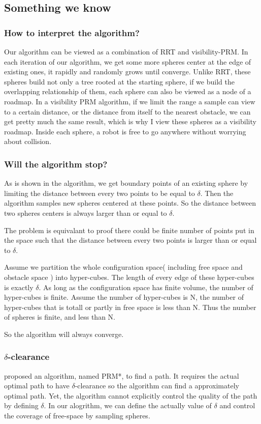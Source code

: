 \documentclass{article}
\begin{document}
	\subsection{Something we know}
    \subsubsection{How to interpret the algorithm? }
      Our algorithm can be viewed as a combination of RRT and visibility-PRM. In each iteration of our algorithm, we get some more spheres center at the edge of existing ones, it rapidly and randomly grows until converge. Unlike RRT, these spheres build not only a tree rooted at the starting sphere, if we build the overlapping relationship of them, each sphere can also be viewed as a node of a roadmap. In a visibility PRM algorithm, if we limit the range a sample can view to a certain distance, or the distance from itself to the nearest obstacle, we can get pretty much the same result, which is why I view these spheres as a visibility roadmap. Inside each sphere, a robot is free to go anywhere without worrying about collision. 

		\subsubsection{Will the algorithm stop?}
 			\label{Finite number of spheres}
 			As is shown in the algorithm, we get boundary points of an existing sphere by limiting the distance between every two points to be equal to $\delta$. Then the algorithm samples new spheres centered at these points. So the distance between two spheres centers is always larger than or equal to $\delta$. 

 			The problem is equivalant to proof there could be finite number of points put in the space such that the distance between every two points is larger than or equal to $\delta$.

 			Assume we partition the whole configuration space( including free space and obstacle space ) into hyper-cubes. The length of every edge of these hyper-cubes is exactly $\delta$. As long as the configuration space has finite volume, the number of hyper-cubes is finite. Assume the number of hyper-cubes is N, the number of hyper-cubes that is totall or partly in free space is less than N. Thus the number of spheres is finite, and less than N.

 			So the algorithm will always converge.	

 		\subsubsection{$\delta$-clearance}
 			\cite{Karaman2011} proposed an algorithm, named PRM*, to find a path. It requires the actual optimal path to have $\delta$-clearance so the algorithm can find a approximately optimal path. Yet, the algorithm cannot explicitly control the quality of the path by defining $\delta$. In our alogrithm, we can define the actually value of $\delta$ and control the coverage of free-space by sampling spheres. 
\end{document}
